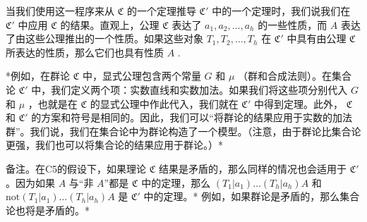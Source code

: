 当我们使用这一程序来从 \(\mathfrak{C}\) 的一个定理推导 \(\mathfrak{C}'\) 中的一个定理时，我们说我们在 \(\mathfrak{C}'\) 中应用 \(\mathfrak{C}\) 的结果。直观上，公理 \(\mathfrak{C}\) 表达了 \(a_1, a_2, \ldots, a_h\) 的一些性质，而 \(A\) 表达了由这些公理推出的一个性质。如果这些对象 \(T_1, T_2, \ldots, T_h\) 在 \(\mathfrak{C}'\) 中具有由公理 \(\mathfrak{C}\) 所表达的性质，那么它们也具有性质 \(A\) .

*例如，在群论 \(\mathfrak{C}\) 中，显式公理包含两个常量 \(G\) 和 \(\mu\) （群和合成法则）。在集合论 \(\mathfrak{C}'\) 中，我们定义两个项：实数直线和实数加法。如果我们将这些项分别代入 \(G\) 和 \(\mu\) ，也就是在 \(\mathfrak{C}\) 的显式公理中作此代入，我们就在 \(\mathfrak{C}'\) 中得到定理。此外， \(\mathfrak{C}\) 和 \(\mathfrak{C}'\) 的方案和符号是相同的。因此，我们可以“将群论的结果应用于实数的加法群”。我们说，我们在集合论中为群论构造了一个模型。（注意，由于群论比集合论更强，我们也可以将集合论的结果应用于群论。）*

备注。在C5的假设下，如果理论 \(\mathfrak{C}\) 结果是矛盾的，那么同样的情况也会适用于 \(\mathfrak{C}'\) 。因为如果 \(A\) 与“非 \(A\)”都是 \(\mathfrak{C}\) 中的定理，那么 \((T_1|a_1)\ldots (T_h|a_h)A\) 和 \(\mathrm{not}(T_1|a_1)\ldots (T_h|a_h)A\) 是 \(\mathfrak{C}'\) 中的定理。* 例如，如果群论是矛盾的，那么集合论也将是矛盾的。*

